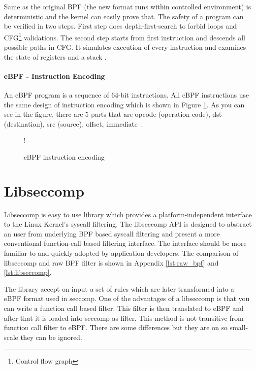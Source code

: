 Same as the original BPF (the new format runs within controlled environment) is deterministic and the kernel can easily prove that.
The safety of a program can be verified in two steps.
First step does depth-first-search to forbid  loops and CFG\footnote{Control flow graph} validations.
The second step starts from first instruction and descends all possible paths in CFG. It simulates execution of every instruction and examines the state of registers and a stack \cite{kernel_bpf_specification}.

\paragraph{eBPF - Instruction Encoding}
An eBPF program is a sequence of 64-bit instructions.
All eBPF instructions use the same design of instruction encoding which is shown in Figure \ref{fig:tikz:eBPF_instruction}.
As you can see in the figure, there are 5 parts that are opcode (operation code), dst (destination), src (source), offset, immediate~\cite{kernel_bpf_specification}.

\begin{figure}[h]
  \centering
  \resizebox {\textwidth} {!} {
	
  }
  \caption{eBPF instruction encoding}
  \label{fig:tikz:eBPF_instruction}
\end{figure}

\section{Libseccomp}
Libseccomp \cite{libseccomp_git} is easy to use library which provides a platform-independent interface to the Linux Kernel's syscall filtering.
The libseccomp API is designed to abstract an user from underlying BPF based syscall filtering and present a more conventional function-call based filtering interface.
The interface should be more familiar to and quickly adopted by application developers.
The comparison of libseccomp and raw BPF filter is shown in Appendix \ref{lst:raw_bpf} and \ref{lst:libseccomp}.

The library accept on input a set of rules which are later transformed into a eBPF format used in seccomp.
One of the advantages of a libseccomp is that you can write a function call based filter.
This filter is then translated to eBPF and after that it is loaded into seccomp as filter.
This method is not transitive from function call filter to eBPF.
There are some differences but they are on so small-scale they can be ignored.

